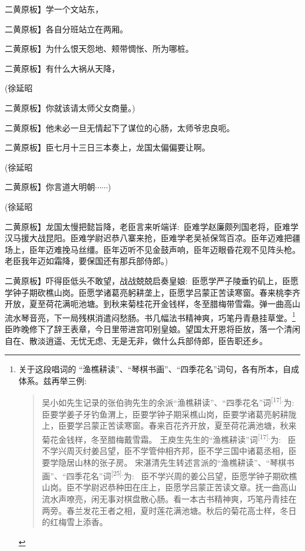 {二黄原板{】学一个文站东，}

二黄原板{】各自分班站立在两厢。}

二黄原板{】为什么恨天怨地、颊带惆怅、所为哪桩。}

二黄原板{】有什么大祸从天降，}

{(徐延昭\hspace{40pt}~

二黄原板{】你就该请太师父女商量。)} }

二黄原板{】他未必一旦无情起下了谋位的心肠，太师爷忠良呃。}

二黄原板{】臣七月十三日三本奏上，龙国太偏偏要让啊。}

{(徐延昭\hspace{40pt}~

二黄原板{】你言道大明朝$\cdots{}\cdots{}$)} }

{(徐延昭\hspace{40pt}~

二黄原板{】龙国太慢把懿旨降，老臣言来听端详:~臣难学赵廉颇列国老将，臣难学汉马援大战昆阳。臣难学尉迟恭八寨来抢，臣难学老吴祯保驾百凉。臣年迈难把疆场上，臣年迈难挽马丝缰。臣年迈听不见金鼓声响，臣年迈眼昏花观不见阵头枪。老臣我年迈如霜降，要保国还有那兵部侍郎。)} }

二黄原板{】吓得臣低头不敢望，战战兢兢启奏皇娘:~臣愿学严子陵垂钓矶上，臣愿学钟子期砍樵山岗。臣愿学诸葛亮躬耕垄上，臣愿学吕蒙正苦读寒窗。春来桃李齐开放，夏至荷花满呃池塘。到秋来菊桂花开金钱样，冬至腊梅带雪霜。弹一曲高山流水琴音亮，下一局残棋消遣闷愁肠。书几幅法书精神爽，巧笔丹青悬挂草堂。}\footnote{{关于这段唱词的  ``渔樵耕读''、``琴棋书画''、``四季花名''词句，各有所本，自成体系。}兹再举三例:~ \begin{quote}  吴小如先生记录的张伯驹先生的余派``渔樵耕读''、``四季花名''词\textsuperscript{{[}17{]}.}为:~ 臣要学姜子牙钓鱼渭上，臣要学钟子期采樵山岗，臣要学诸葛亮躬耕陇上，臣要学吕蒙正苦读寒窗。春来百花齐开放，夏至荷花满池塘，秋来菊花金钱样，冬至腊梅戴雪霜。  王庾生先生的``渔樵耕读''词\textsuperscript{{[}17{]}.}为:~ 臣不学兴周灭纣姜吕望，臣不学管仲相齐邦，臣不学三国中诸葛丞相，臣要学隐居山林的张子房。  宋湛清先生转述言派的``渔樵耕读''、``琴棋书画''、``四季花名''词\textsuperscript{{[}25{]}.}为:~ 臣不学兴周的姜公吕望，臣愿学钟子期砍樵山岗。臣不学尉迟恭种田在庄上，臣愿学吕蒙正苦读文章。抚一曲高山流水声嘹亮，闲无事对棋盘散心肠。看一本古书精神爽，巧笔丹青挂在两旁。春兰发花王者之相，夏时莲花满池塘。秋后的菊花高士样，冬日的红梅雪上添香。  \end{quote}  }{臣昨晚修下了辞王表章，今日里带进宫叩别皇娘。望国太开恩将臣放，落一个清闲自在、散淡逍遥、无忧无虑、无是无非，做什么兵部侍郎，臣告职还乡。}

}
